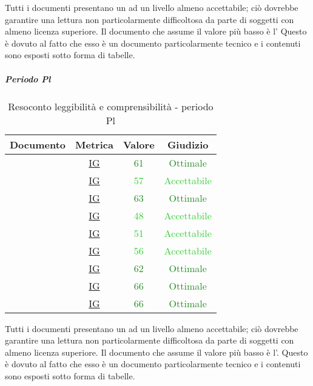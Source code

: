 						Tutti i documenti presentano un  ad un livello almeno accettabile; ciò dovrebbe garantire una lettura non particolarmente difficoltosa da parte di soggetti con almeno licenza superiore.
						Il documento che assume il valore più basso è l'\adrvuno{}
						 Questo è dovuto al fatto che esso è un documento particolarmente tecnico e i contenuti sono esposti sotto forma di tabelle.	
						
						\subparagraph{Periodo Pl}
						
						\begin{table}[H]
							\centering
							\small
							\begin{tabular}{c | c | c | c}
								\hline
								\textbf{Documento} & \textbf{Metrica}    & \textbf{Valore} & \textbf{Giudizio} \\ \hline
								\pdpvdue        & \hyperref[MLEC]{IG} & \textcolor{ForestGreen}{61} & \textcolor{ForestGreen}{Ottimale} \\
								\pdqvdue        & \hyperref[MLEC]{IG} & \textcolor{LimeGreen}{57} & \textcolor{LimeGreen}{Accettabile} \\
								\ndpvdue        & \hyperref[MLEC]{IG} & \textcolor{ForestGreen}{63} & \textcolor{ForestGreen}{Ottimale} \\
								\adrvdue        & \hyperref[MLEC]{IG}  & \textcolor{LimeGreen}{48} & \textcolor{LimeGreen}{Accettabile} \\
								\stvuno		& \hyperref[MLEC]{IG}  & \textcolor{LimeGreen}{51} & \textcolor{LimeGreen}{Accettabile} \\
								\glvdue        & \hyperref[MLEC]{IG} & \textcolor{LimeGreen}{56} & \textcolor{LimeGreen}{Accettabile} \\
								\vcinquei       & \hyperref[MLEC]{IG}& \textcolor{ForestGreen}{62} & \textcolor{ForestGreen}{Ottimale} \\
								\vseii       & \hyperref[MLEC]{IG} &  \textcolor{ForestGreen}{66} & \textcolor{ForestGreen}{Ottimale} \\
								\vtree       & \hyperref[MLEC]{IG}& \textcolor{ForestGreen}{66} & \textcolor{ForestGreen}{Ottimale} \\
							\end{tabular}
							\caption{Resoconto leggibilità e comprensibilità - periodo Pl}
							\label{tab_resoconto_leggibilità_e_comprensibilità_PPL}
						\end{table}
						
						Tutti i documenti presentano un  ad un livello almeno accettabile; ciò dovrebbe garantire una lettura non particolarmente difficoltosa da parte di soggetti con almeno licenza superiore.
						Il documento che assume il valore più basso è l'\adrvdue. Questo è dovuto al fatto che esso è un documento particolarmente tecnico e i contenuti sono esposti sotto forma di tabelle.	
						
